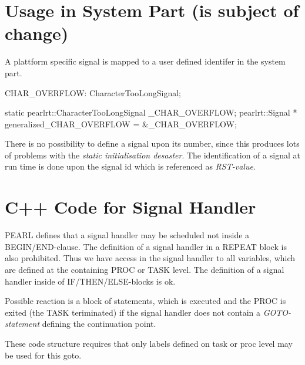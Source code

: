 \section{Usage in System Part (is subject of change)}
A plattform specific signal is mapped to a user defined identifer in the 
system part. 

\begin{PEARLCode}
CHAR_OVERFLOW: CharacterTooLongSignal;
\end{PEARLCode}

\begin{CppCode}
static pearlrt::CharacterTooLongSignal _CHAR_OVERFLOW;
pearlrt::Signal * generalized_CHAR_OVERFLOW = &_CHAR_OVERFLOW;
\end{CppCode}

There is no possibility to define a signal upon its number, since this
produces lots of problems with the {\em static initialisation desaster}.
The identification of a signal at run time is done upon the signal id
which is referenced as {\em RST-value}.


\section{C++ Code for Signal Handler}
PEARL defines that a signal handler may be scheduled not inside 
a BEGIN/END-clause. The definition of a signal handler in a REPEAT block is also
prohibited. Thus we have access in the signal handler to all variables, which are defined
at the containing PROC or TASK level.
The definition of a signal handler inside of IF/THEN/ELSE-blocks is ok.

Possible reaction is a block of statements, which is executed and the
PROC is exited (the TASK teriminated) if the signal handler does not
contain a {\em GOTO-statement} defining the continuation point.

These code structure requires that only labels defined on task or proc level
may be used for this goto.

